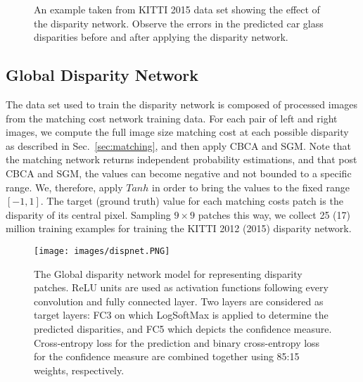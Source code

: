 \documentclass[10pt, twocolumn, letterpaper]{article}
\begin{document}
\begin{figure}[t]
\centering



\caption{An example taken from KITTI 2015 data set showing the effect of the disparity network. Observe the errors in the predicted car glass disparities before and after applying the disparity network. }
\label{fig:kittiexample}
\end{figure}

\subsection{Global Disparity Network}

The data set used to train the disparity network is composed of processed images from the matching cost network training data. For each pair of left and right images, we compute the full image size matching cost at each possible disparity as described in Sec.~\ref{sec:matching}, and then apply CBCA and SGM. Note that the matching network returns independent probability estimations, and that post CBCA and SGM, the values can become negative and not bounded to a specific range. We, therefore, apply $Tanh$ in order to bring the values to the fixed range $[-1,1]$. The target (ground truth) value for each matching costs patch is the disparity of its central pixel. Sampling $9\times 9$ patches this way, we collect 25 (17) million training examples for training the KITTI 2012 (2015) disparity network.

\begin{figure*}[t]
\centering
\texttt{[image: images/dispnet.PNG]}
   \caption{The Global disparity network model for representing disparity patches. ReLU units are used as activation functions following every convolution and fully connected layer. Two layers are considered as target layers: FC3 on which LogSoftMax is applied to determine the predicted disparities, and FC5 which depicts the confidence measure. Cross-entropy loss for the prediction and binary cross-entropy loss for the confidence measure are combined together using 85:15 weights, respectively.}
\label{fig:dispnet}
\end{figure*}
\end{document}
